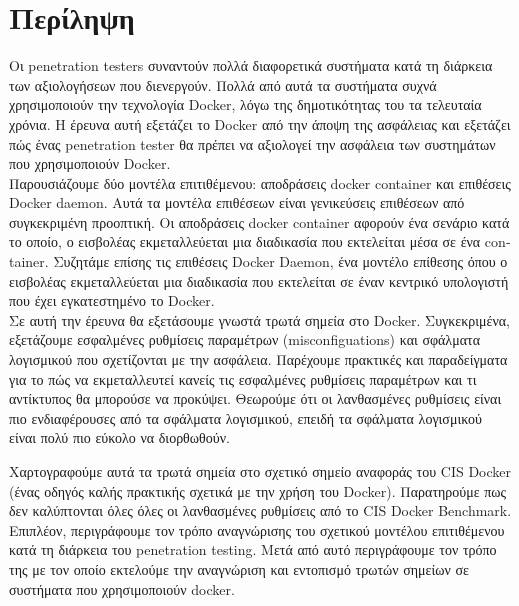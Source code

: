 \section{Περίληψη}
\label{Abstract}

Οι \textlatin{penetration testers} συναντούν πολλά διαφορετικά συστήματα
κατά τη διάρκεια των αξιολογήσεων που διενεργούν. Πολλά από αυτά τα συστήματα
συχνά χρησιμοποιούν την τεχνολογία \textlatin{Docker},
λόγω της δημοτικότητας του τα τελευταία χρόνια. Η έρευνα αυτή
εξετάζει το \textlatin{Docker} από την άποψη της ασφάλειας και εξετάζει πώς
ένας \textlatin{penetration tester} θα πρέπει να αξιολογεί την ασφάλεια των
συστημάτων που χρησιμοποιούν \textlatin{Docker}.\mbox{} \\

Παρουσιάζουμε δύο μοντέλα επιτιθέμενου: αποδράσεις \textlatin{docker container}
και επιθέσεις \textlatin{Docker daemon}. Αυτά τα μοντέλα επιθέσεων είναι
γενικεύσεις επιθέσεων από συγκεκριμένη προοπτική. Οι αποδράσεις
\textlatin{docker container} αφορούν ένα σενάριο κατά το οποίο, ο
εισβολέας εκμεταλλεύεται μια διαδικασία που εκτελείται μέσα
σε ένα \textlatin{container}. Συζητάμε επίσης τις επιθέσεις
\textlatin{Docker Daemon}, ένα μοντέλο επίθεσης όπου ο εισβολέας εκμεταλλεύεται
μια διαδικασία που εκτελείται σε έναν κεντρικό υπολογιστή που έχει
εγκατεστημένο το \textlatin{Docker}.\mbox{} \\

Σε αυτή την έρευνα θα εξετάσουμε γνωστά τρωτά σημεία στο \textlatin{Docker}.
Συγκεκριμένα, εξετάζουμε εσφαλμένες ρυθμίσεις παραμέτρων 
(\textlatin{misconfiguations}) και σφάλματα λογισμικού που
σχετίζονται με την ασφάλεια. Παρέχουμε πρακτικές και παραδείγματα για το πώς να
εκμεταλλευτεί κανείς τις εσφαλμένες ρυθμίσεις παραμέτρων και τι
αντίκτυπος θα μπορούσε να προκύψει. Θεωρούμε ότι οι λανθασμένες ρυθμίσεις
είναι πιο ενδιαφέρουσες από τα σφάλματα λογισμικού, επειδή τα σφάλματα
λογισμικού είναι πολύ πιο εύκολο να διορθωθούν.

Χαρτογραφούμε αυτά τα τρωτά σημεία στο σχετικό σημείο αναφοράς του
\textlatin{CIS Docker} (ένας οδηγός καλής πρακτικής σχετικά με την χρήση του
\textlatin{Docker}). Παρατηρούμε πως δεν καλύπτονται όλες όλες
οι λανθασμένες ρυθμίσεις από το \textlatin{CIS Docker Benchmark}.\mbox{} \\

Επιπλέον, περιγράφουμε τον τρόπο αναγνώρισης του σχετικού μοντέλου
επιτιθέμενου κατά τη διάρκεια του \textlatin{penetration testing}.
Μετά από αυτό περιγράφουμε τον τρόπο της με τον οποίο εκτελούμε την αναγνώριση
και εντοπισμό τρωτών σημείων σε συστήματα που χρησιμοποιούν
\textlatin{docker}.\mbox{} \\

